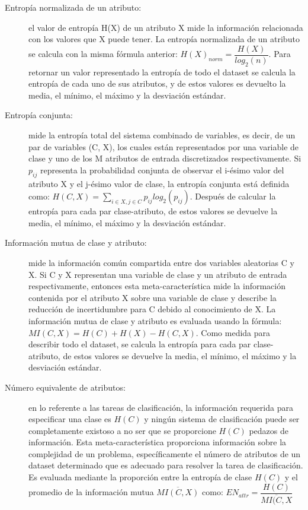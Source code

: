\begin{itemize}
\begin{description}
		\item[Entropía normalizada de un atributo:] el valor de entropía H(X) de un atributo X mide la información relacionada con los valores que X puede tener. La entropía normalizada de un atributo se calcula con la misma fórmula anterior: $H(X)_{norm} = \dfrac{H(X)}{log_2(n)}$. Para retornar un valor representado la entropía de todo el dataset se calcula la entropía de cada uno de sus atributos, y de estos valores es devuelto la media, el mínimo, el máximo y la desviación estándar.
		\item[Entropía conjunta:] mide la entropía total del sistema combinado de variables, es decir, de un par de variables (C, X), los cuales están representados por una variable de clase y uno de los M atributos de entrada discretizados respectivamente. Si $p_{ij}$ representa la probabilidad conjunta de observar el i-ésimo valor del atributo X y el j-ésimo valor de clase, la entropía conjunta está definida como: $H(C, X) = \sum_{i \in X, j \in C} p_{ij} log_2(p_{ij})$. Después de calcular la entropía para cada par clase-atributo, de estos valores se devuelve la media, el mínimo, el máximo y la desviación estándar.
		\item[Información mutua de clase y atributo:] mide la información común compartida entre dos variables aleatorias C y X. Si C y X representan una variable de clase y un atributo de entrada respectivamente, entonces esta meta-característica mide la información contenida por el atributo X sobre una variable de clase y describe la reducción de incertidumbre para C debido al conocimiento de X. La información mutua de clase y atributo es evaluada usando la fórmula: $MI(C, X) = H(C) + H(X) - H(C, X)$. Como medida para describir todo el dataset, se calcula la entropía para cada par clase-atributo, de estos valores se devuelve la media, el mínimo, el máximo y la desviación estándar.
		\item[Número equivalente de atributos:] en lo referente a las tareas de clasificación, la información requerida para especificar una clase es $H(C)$ y ningún sistema de clasificación puede ser completamente existoso a no ser que se proporcione  $H(C)$ pedazos de información. Esta meta-característica proporciona información sobre la complejidad de un problema, específicamente el número de atributos de un dataset determinado que es adecuado para resolver la tarea de clasificación. Es evaluada mediante la proporción entre la entropía de clase $H(C)$ y el promedio de la información mutua $\overline{MI(C, X)}$ como: $EN_{attr} = \dfrac{H(C)}{\overline{MI(C, X}}$

\end{description}
\end{itemize}

